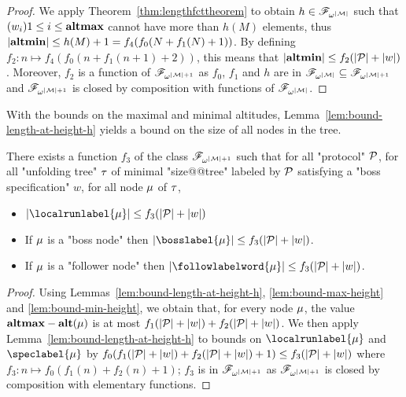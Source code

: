 \begin{proof}
	We apply Theorem~\ref{thm:lengthfcttheorem} to obtain $h \in \mathscr{F}_{\omega^{|\mathcal{M}|}}$ such that $(w_i){1\leq i \leq \mathbf{altmax}}$ cannot have more than $h(M)$ elements, thus $|\mathbf{altmin}| \leq h(M)+1 = f_4(f_0(N+f_1(N)+1))$. By defining $f_2: n \mapsto f_4(f_0(n+f_1(n+1)+2))$, this means that $|\mathbf{altmin}| \leq f_2(|\mathcal{P}| + |w|)$. Moreover, $f_2$ is a function of $\mathscr{F}_{\omega^{|\mathcal{M}|+1}}$ as $f_0$, $f_1$ and $h$ are in $\mathscr{F}_{\omega^{|\mathcal{M}|}} \subseteq \mathscr{F}_{\omega^{|\mathcal{M}|+1}}$ and $\mathscr{F}_{\omega^{|\mathcal{M}|+1}}$ is closed by composition with functions of $\mathscr{F}_{\omega^{|\mathcal{M}|}}$.
\end{proof}

With the bounds on the maximal and minimal altitudes, Lemma~\ref{lem:bound-length-at-height-h} yields a bound on the size of all nodes in the tree.


\begin{lemma}
	\label{lem:bound-node-size}
	There exists a function $f_3$ of the class $\mathscr{F}_{\omega^{|\mathcal{M}|+1}}$ such that for all "protocol" $\mathcal{P}$, for all "unfolding tree" $\tau$ of minimal "size@@tree" labeled by $\mathcal{P}$ satisfying a "boss specification" $w$, for all node $\mu$ of $\tau$,
	
		\begin{itemize}
		\item $\size{\localrunlabel{\node}} \leq f_3(\size{\prot}+ \size{w})$
			
		\item If $\mu$ is a "boss node" then $\size{\bosslabel{\node}} \leq f_3(\size{\prot}+ \size{w})$.
		
		\item If $\mu$ is a "follower node" then $\size{\followlabelword{\node}} \leq f_3(\size{\prot}+ \size{w})$.
	\end{itemize} 
\end{lemma}
\begin{proof}
	Using Lemmas~\ref{lem:bound-length-at-height-h}, \ref{lem:bound-max-height} and \ref{lem:bound-min-height}, we obtain that, for every node $\mu$, the value $\mathbf{altmax} - \mathbf{alt}(\mu)$ is at most $f_1(|\mathcal{P}| + |w|) + f_2(|\mathcal{P}| + |w|)$. We then apply Lemma~\ref{lem:bound-length-at-height-h} to bounds on $\localrunlabel{\node}$ and $\speclabel{\node}$ by $f_0(f_1(|\mathcal{P}| + |w|) + f_2(|\mathcal{P}| + |w|)+1) \leq f_3(|\mathcal{P}| + |w|)$ where $f_3: n \mapsto f_0(f_1(n) + f_2(n)+1)$; $f_3$ is in $\mathscr{F}_{\omega^{|\mathcal{M}|+1}}$ as $\mathscr{F}_{\omega^{|\mathcal{M}|+1}}$ is closed by composition with elementary functions. 
\end{proof}

